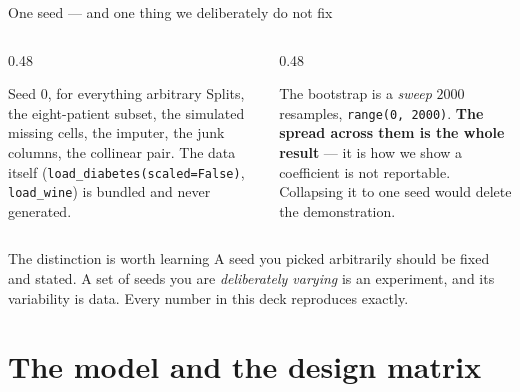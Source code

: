\documentclass[aspectratio=169]{beamer}
\begin{document}
\begin{frame}[shrink=5]{One seed --- and one thing we deliberately do not fix}
  \begin{columns}[T]
    \begin{column}{0.48\textwidth}
      \begin{block}{Seed $0$, for everything arbitrary}
        \small Splits, the eight-patient subset, the simulated missing cells,
        the imputer, the junk columns, the collinear pair. The data itself
        (\texttt{load\_diabetes(scaled=False)}, \texttt{load\_wine}) is
        bundled and never generated.
      \end{block}
    \end{column}
    \begin{column}{0.48\textwidth}
      \begin{alertblock}{The bootstrap is a \emph{sweep}}
        \small $2000$ resamples, \texttt{range(0, 2000)}. \textbf{The spread
        across them is the whole result} --- it is how we show a coefficient
        is not reportable. Collapsing it to one seed would delete the
        demonstration.
      \end{alertblock}
    \end{column}
  \end{columns}
  \vspace{0.4em}
  \begin{exampleblock}{The distinction is worth learning}
    \centering\small
    A seed you picked arbitrarily should be fixed and stated. A set of seeds
    you are \emph{deliberately varying} is an experiment, and its variability
    is data. Every number in this deck reproduces exactly.
  \end{exampleblock}
\end{frame}

\section[Model]{The model and the design matrix}
\label{sec:model}
\end{document}
